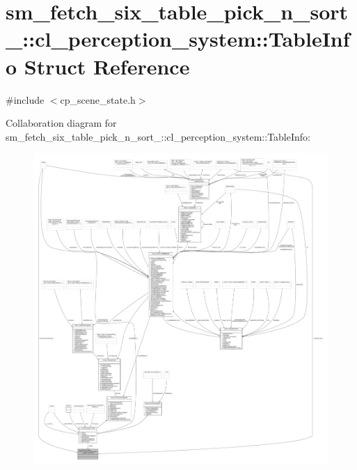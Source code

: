 \hypertarget{structsm__fetch__six__table__pick__n__sort__1_1_1cl__perception__system_1_1TableInfo}{}\section{sm\+\_\+fetch\+\_\+six\+\_\+table\+\_\+pick\+\_\+n\+\_\+sort\+\_\+:\+:cl\+\_\+perception\+\_\+system\+:\+:Table\+Info Struct Reference}
\label{structsm__fetch__six__table__pick__n__sort__1_1_1cl__perception__system_1_1TableInfo}


{\ttfamily \#include $<$cp\+\_\+scene\+\_\+state.\+h$>$}



Collaboration diagram for sm\+\_\+fetch\+\_\+six\+\_\+table\+\_\+pick\+\_\+n\+\_\+sort\+\_\+:\+:cl\+\_\+perception\+\_\+system\+:\+:Table\+Info\+:
\nopagebreak
\begin{figure}[H]
\begin{center}
\leavevmode
\includegraphics[width=350pt]{structsm__fetch__six__table__pick__n__sort__1_1_1cl__perception__system_1_1TableInfo__coll__graph}
\end{center}
\end{figure}
